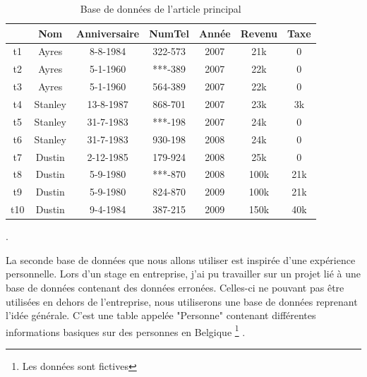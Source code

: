 \documentclass[letterpaper, 12pt]{report}
\theoremstyle{definition}
\begin{document}
\begin{table}[H]
	\centering
	\begin{tabular}{|c|c c c c c c|}
	\hline
	    & Nom & Anniversaire & NumTel & Année & Revenu & Taxe\\
	\hline
	 t1 & Ayres & 8-8-1984 & 322-573 & 2007 & 21k & 0\\
	 t2 & Ayres & 5-1-1960 & ***-389 & 2007 & 22k & 0 \\
	 t3 & Ayres & 5-1-1960 & 564-389 & 2007 & 22k & 0 \\
	 t4 & Stanley & 13-8-1987 & 868-701 & 2007 & 23k & 3k\\
	 t5 & Stanley & 31-7-1983 & ***-198 & 2007 & 24k & 0\\
	 t6 & Stanley & 31-7-1983 & 930-198 & 2008 & 24k & 0\\
	 t7 & Dustin & 2-12-1985 & 179-924 & 2008 & 25k & 0 \\
	 t8 & Dustin & 5-9-1980 & ***-870 & 2008 & 100k & 21k \\
	 t9 & Dustin & 5-9-1980 & 824-870 & 2009 & 100k & 21k \\
	 t10 & Dustin & 9-4-1984 & 387-215 & 2009 & 150k & 40k \\
	 \hline
	\end{tabular}
	\caption{\label{tableMain} Base de données de l'article principal \cite{main}}.
\end{table}

La seconde base de données que nous allons utiliser est inspirée d'une expérience personnelle. Lors d'un stage en entreprise, j'ai pu travailler sur un projet lié à une base de données contenant des données erronées. Celles-ci ne pouvant pas être utilisées en dehors de l'entreprise, nous utiliserons une base de données reprenant l'idée générale. C'est une table appelée "Personne" contenant différentes informations basiques sur des personnes en Belgique \footnote{Les données sont fictives} . 
\end{document}
